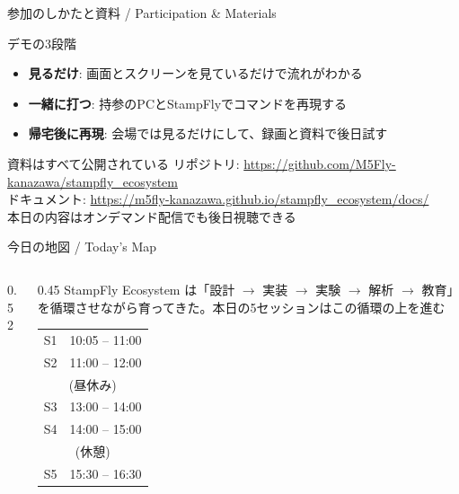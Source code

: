 \begin{frame}[fragile]{参加のしかたと資料 / Participation \& Materials}
  \begin{block}{デモの3段階}
    \begin{itemize}\small
      \item \textbf{見るだけ}: 画面とスクリーンを見ているだけで流れがわかる
      \item \textbf{一緒に打つ}: 持参のPCとStampFlyでコマンドを再現する
      \item \textbf{帰宅後に再現}: 会場では見るだけにして、録画と資料で後日試す
    \end{itemize}
  \end{block}

  \vspace{0.5em}

  \begin{exampleblock}{資料はすべて公開されている}
    \footnotesize
    リポジトリ: \url{https://github.com/M5Fly-kanazawa/stampfly_ecosystem}\\
    ドキュメント: \url{https://m5fly-kanazawa.github.io/stampfly_ecosystem/docs/}\\
    本日の内容はオンデマンド配信でも後日視聴できる
  \end{exampleblock}
\end{frame}

\begin{frame}{今日の地図 / Today's Map}
  \begin{columns}[T]
    \begin{column}{0.52\textwidth}
      \centering
      \vspace{-1mm}
    \end{column}
    \begin{column}{0.45\textwidth}
      \small
      StampFly Ecosystem は「設計 $\to$ 実装 $\to$ 実験 $\to$ 解析 $\to$ 教育」を循環させながら育ってきた。本日の5セッションはこの循環の上を進む
      \vspace{0.5em}

      \begin{table}
        \centering\scriptsize
        \begin{tabular}{ll}
          \hline
          S1 & 10:05 -- 11:00 \\
          S2 & 11:00 -- 12:00 \\
          \multicolumn{2}{c}{(昼休み)} \\
          S3 & 13:00 -- 14:00 \\
          S4 & 14:00 -- 15:00 \\
          \multicolumn{2}{c}{(休憩)} \\
          S5 & 15:30 -- 16:30 \\
          \hline
        \end{tabular}
      \end{table}
    \end{column}
  \end{columns}
\end{frame}

